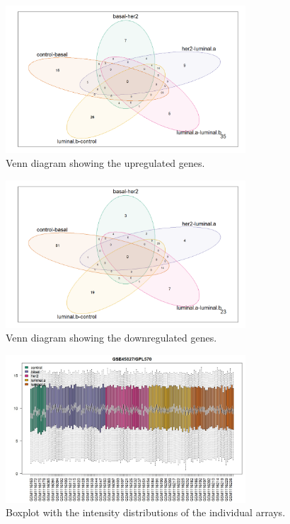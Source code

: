\documentclass[journal]{IEEEtran}
\begin{document}
\begin{figure}
    \centering
    \includegraphics[width=0.8\textwidth]{images/DE/Venn_up.jpg}
    \caption{Venn diagram showing the upregulated genes.}
    \label{fig:Venn_up_DE}
\end{figure}

\begin{figure}
    \centering
    \includegraphics[width=0.8\textwidth]{images/DE/Venn_down.jpg}
    \caption{Venn diagram showing the downregulated genes.}
    \label{fig:Venn_down_DE}
\end{figure}

\begin{figure}
    \centering
    \includegraphics[width=0.8\textwidth]{images/DE/boxplot_DE.jpg}
    \caption{Boxplot with the intensity distributions of the 
individual arrays.}
    \label{fig:boxplotDE}
\end{figure}


\newpage

 
\end{document}
